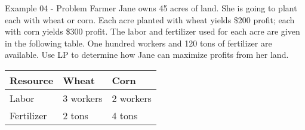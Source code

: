 \begin{frame}{Example 04 - Problem}
Farmer Jane owns 45 acres of land. She is going to plant each with wheat or 
corn. Each acre planted with wheat yields \$200 profit; each with corn yields 
\$300 profit. The labor and fertilizer used for each acre are given in the 
following table. One hundred workers and 120 tons of fertilizer are available. 
Use LP to determine how Jane can maximize profits from her land.

\begin{center}
\begin{tabular}{lll}
\hline
  \cellcolor{gray90}\textbf{Resource} 
& \cellcolor{gray90}\textbf{Wheat} 
& \cellcolor{gray90}\textbf{Corn} \\
\hline
Labor      & 3 workers & 2 workers \\
Fertilizer & 2 tons    & 4 tons \\
\hline 
\end{tabular}
\end{center}

\end{frame}
